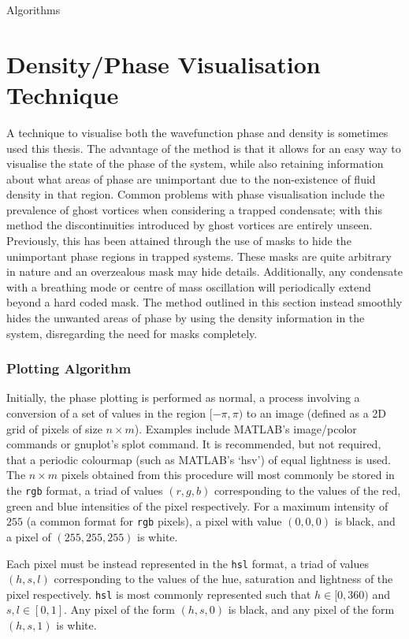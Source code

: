 \begin{chapter}{\label{app:algorithms}Algorithms}
\section{\label{appsection:vizalgos} Density/Phase Visualisation Technique}
A technique to visualise both the wavefunction phase and density is sometimes used this thesis. The advantage of the method is that it allows for an easy way to visualise the state of the phase of the system, while also retaining information about what areas of phase are unimportant due to the non-existence of fluid density in that region. Common problems with phase visualisation include the prevalence of ghost vortices\cite{tsubota_kasamatsu_02} when considering a trapped condensate; with this method the discontinuities introduced by ghost vortices are entirely unseen. Previously, this has been attained through the use of masks to hide the unimportant phase regions in trapped systems. These masks are quite arbitrary in nature and an overzealous mask may hide details. Additionally, any condensate with a breathing mode or centre of mass oscillation will periodically extend beyond a hard coded mask. The method outlined in this section instead smoothly hides the unwanted areas of phase by using the density information in the system, disregarding the need for masks completely.
\subsubsection{Plotting Algorithm}
Initially, the phase plotting is performed as normal, a process involving a conversion of a set of values in the region $[-\pi,\pi)$ to an image (defined as a 2D grid of pixels of size $n\times m$). Examples include MATLAB's image/pcolor commands or gnuplot's splot command. It is recommended, but not required, that a periodic colourmap (such as MATLAB's `hsv') of equal lightness is used. The $n \times m$ pixels obtained from this procedure will most commonly be stored in the {\tt rgb} format, a triad of values $(r,g,b)$ corresponding to the values of the red, green and blue intensities of the pixel respectively. For a maximum intensity of $255$ (a common format for {\tt rgb} pixels), a pixel with value $(0,0,0)$ is black, and a pixel of $(255,255,255)$ is white.

Each pixel must be instead represented in the {\tt hsl} format, a triad of values $(h,s,l)$ corresponding to the values of the hue, saturation and lightness of the pixel respectively. {\tt hsl} is most commonly represented such that $h \in [0,360)$ and $s,l \in [0,1]$. Any pixel of the form $(h,s,0)$ is black, and any pixel of the form $(h,s,1)$ is white.


\end{chapter}
